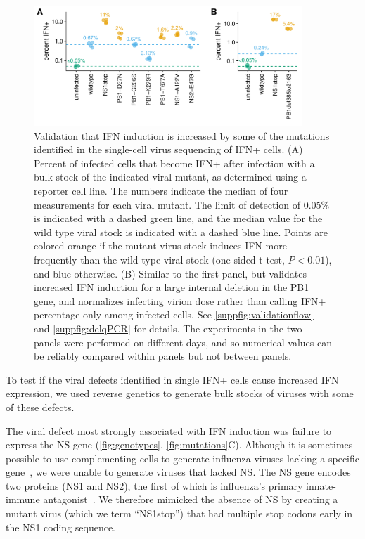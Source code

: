 \documentclass[]{asm-article}
\newcommand{\FIG}[1]{\autoref{fig:#1}}
\newcommand{\SUPPFIG}[1]{\autoref{suppfig:#1}}
\begin{document}
\begin{figure}

\centerline{\includegraphics[width=0.9\textwidth]{figures/Validation_Figure/ifn_plot.pdf}}
\caption{
Validation that IFN induction is increased by some of the mutations identified in the single-cell virus sequencing of IFN+ cells.
(A)
Percent of infected cells that become IFN+ after infection with a bulk stock of the indicated viral mutant, as determined using a reporter cell line.
The numbers indicate the median of four measurements for each viral mutant.
The limit of detection of 0.05\% is indicated with a dashed green line, and the median value for the wild type viral stock is indicated with a dashed blue line.
Points are colored orange if the mutant virus stock induces IFN more frequently than the wild-type viral stock (one-sided t-test, $P < 0.01$), and blue otherwise.
(B)
Similar to the first panel, but validates increased IFN induction for a large internal deletion in the PB1 gene, and normalizes infecting virion dose rather than calling IFN+ percentage only among infected cells.
See \SUPPFIG{validationflow} and \SUPPFIG{delqPCR} for details.
The experiments in the two panels were performed on different days, and so numerical values can be reliably compared within panels but not between panels.
}
\label{fig:validation}

\end{figure}

To test if the viral defects identified in single IFN+ cells cause increased IFN expression, we used reverse genetics to generate bulk stocks of viruses with some of these defects.

The viral defect most strongly associated with IFN induction was failure to express the NS gene (\FIG{genotypes}, \FIG{mutations}C).
Although it is sometimes possible to use complementing cells to generate influenza viruses lacking a specific gene~\cite{fujii2003selective,marsh2007specific}, we were unable to generate viruses that lacked NS.
The NS gene encodes two proteins (NS1 and NS2), the first of which is influenza's primary innate-immune antagonist~\cite{garcia1998influenza, hale2008multifunctional}.
We therefore mimicked the absence of NS by creating a mutant virus (which we term ``NS1stop'') that had multiple stop codons early in the NS1 coding sequence.
\end{document}
